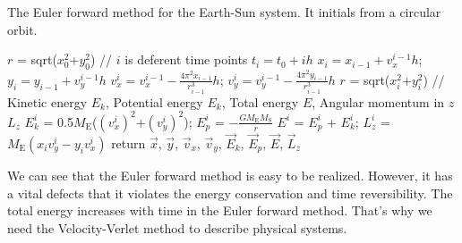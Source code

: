 \begin{algorithm}[tb]
	\label{alg::euler}
	\caption{The Euler forward method for the Earth-Sun system. It initials from a circular orbit.}
	$r$ = sqrt($x_0^2$+$y_0^2$)\;
	// $i$ is deferent time points $t_i=t_0+ih$\;
    { $x_{i} = x_{i-1} + v_x^{{i-1}}h$;
    $y_{i} = y_{i-1} + v_y^{{i-1}}h$\;
    $v_x^{i} = v_x^{i-1} - \frac{4\pi^2x_{i-1}}{r_{i-1}^3}h$;
    $v_y^{i} = v_y^{i-1} - \frac{4\pi^2y_{i-1}}{r_{i-1}^3}h$\;
    $r$ = sqrt($x_i^2$+$y_i^2$)\;
    // Kinetic energy $E_k$, Potential energy $E_k$, Total energy $E$, Angular momentum in $\hat{z}$ $L_z$\;
    $E_k^i$ = 0.5$M_{\mathrm{E}}$($(v_x^{i})^2$+$(v_y^{i})^2$);
    $E_p^i$ = $-\frac{GM_{\mathrm{E}}M_{\mathrm{S}}}{r}$\;
    $E^i$ = $E_p^i$ + $E_k^i$;
    $L_z^i$ = $M_{\mathrm{E}}(x_iv_y^{i}-y_iv_x^{i})$\;
    }
	return $\vec{x}$, $\vec{y}$, $\vec{v}_x$, $\vec{v}_y$, $\vec{E}_k$, $\vec{E}_p$, $\vec{E}$, $\vec{L}_z$\;
\end{algorithm}

We can see that the Euler forward method is easy to be realized.
 However, it has a vital defects that it violates the energy conservation and time reversibility.
 The total energy increases with time in the Euler forward method.
 That's why we need the Velocity-Verlet method to describe physical systems.
